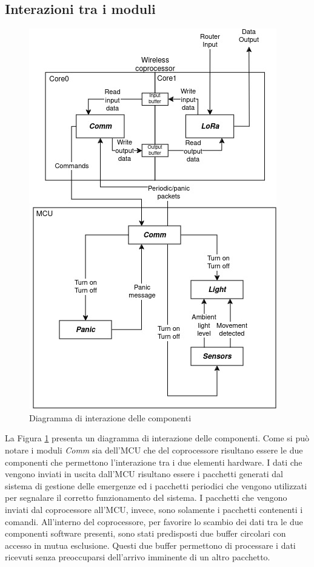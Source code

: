 \documentclass{article}
\begin{document}
	\subsection{Interazioni tra i moduli}
	\begin{figure}[ht]
		\centering
		\includegraphics[scale=0.5]{./images/Interaction_diagram.jpg}
		\caption{Diagramma di interazione delle componenti}
		\label{img:interaction_diag}
	\end{figure}
	\noindent La Figura \ref{img:interaction_diag} presenta un diagramma di interazione delle componenti.
	Come si pu\`o notare i moduli \textit{Comm} sia dell'MCU che del coprocessore risultano essere le due componenti che permettono l'interazione tra i due elementi hardware. I dati che vengono inviati in uscita dall'MCU risultano essere i pacchetti generati dal sistema di gestione delle emergenze ed i pacchetti periodici che vengono utilizzati per segnalare il corretto funzionamento del sistema. I pacchetti che vengono inviati dal coprocessore all'MCU, invece, sono solamente i pacchetti contenenti i comandi.
	All'interno del coprocessore, per favorire lo scambio dei dati tra le due componenti software presenti, sono stati predisposti due buffer circolari con accesso in mutua esclusione. Questi due buffer permettono di processare i dati ricevuti senza preoccuparsi dell'arrivo imminente di un altro pacchetto.
\end{document}
